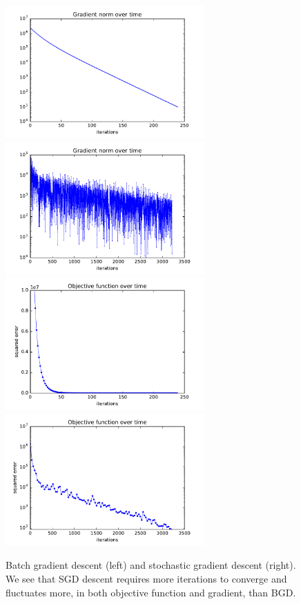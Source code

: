 \documentclass{article}
\begin{document}
\begin{multicols}{2}
\begin{figure}%
   \centering
   \includegraphics[width=3in]{img/1-1-batch.pdf}  %
   \includegraphics[width=3in]{img/1-1-stoch.pdf}  %
   \includegraphics[width=3in]{img/1-1-batch-func.pdf}  %
   \includegraphics[width=3in]{img/1-1-stoch-func.pdf}  %
   \caption{Batch gradient descent (left) and stochastic gradient descent (right). We see that SGD descent requires more iterations to converge and fluctuates more, in both objective function and gradient, than BGD.}
   \label{fig:1.2}
\end{figure}



\end{multicols}
\end{document}
